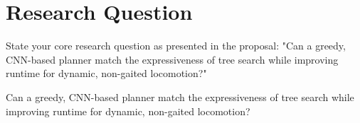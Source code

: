 \section{Research Question}

\begin{outline}
  State your core research question as presented in the proposal:
  "Can a greedy, CNN-based planner match the expressiveness of tree
  search while improving runtime for dynamic, non-gaited locomotion?"
\end{outline}

\begin{emphasis}
  Can a greedy, CNN-based planner match the expressiveness of tree
  search while improving runtime for dynamic, non-gaited locomotion?
\end{emphasis}
